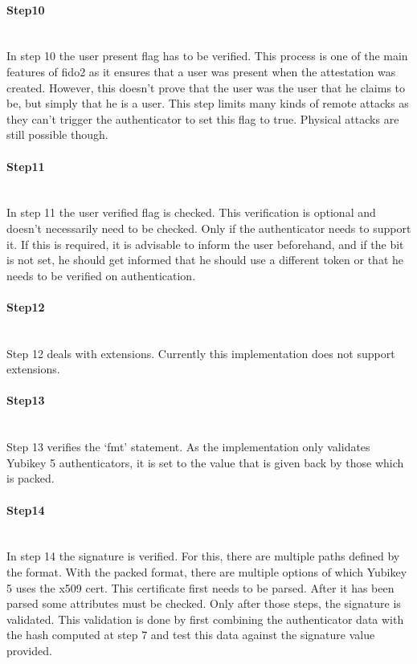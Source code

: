 \documentclass[a4paper, 11pt]{scrartcl}
\begin{document}
\paragraph{Step10}\hfill \\ 
In step 10 the user present flag has to be verified. This process is one of the main features of \gls{fido2} as it ensures that a user was present when the attestation was created. However, this doesn't prove that the user was the user that he claims to be, but simply that he is a user. This step limits many kinds of remote attacks as they can't trigger the authenticator to set this flag to true. Physical attacks are still possible though.

\paragraph{Step11}\hfill \\ 
In step 11 the user verified flag is checked. This verification is optional and doesn't necessarily need to be checked. Only if the authenticator needs to support it. If this is required, it is advisable to inform the user beforehand, and if the bit is not set, he should get informed that he should use a different token or that he needs to be verified on authentication.

\paragraph{Step12}\hfill \\ 
Step 12 deals with extensions. Currently this implementation does not support extensions.

\paragraph{Step13}\hfill \\ 
Step 13 verifies the `fmt' statement. As the implementation only validates Yubikey 5 authenticators, it is set to the value that is given back by those which is packed.

\paragraph{Step14}\hfill \\ 
In step 14 the signature is verified. For this, there are multiple paths defined by the format. With the packed format, there are multiple options of which Yubikey 5 uses the x509 cert. This certificate first needs to be parsed. After it has been parsed some attributes must be checked. Only after those steps, the signature is validated. This validation is done by first combining the authenticator data with the hash computed at step 7 and test this data against the signature value provided.
\end{document}
